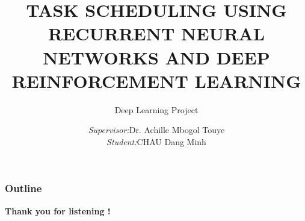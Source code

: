 \documentclass[xcolor=dvipsnames, aspectratio=169, 10pt]{beamer}
\title[]{TASK SCHEDULING USING RECURRENT NEURAL NETWORKS AND DEEP REINFORCEMENT LEARNING}
\subtitle{Deep Learning Project}
\author[Minh]{
		\begin{tabular}{lll}
			\textit{\small Supervisor:} & \small Dr. Achille Mbogol Touye \\
			\textit{\small Student:} & \small CHAU Dang Minh
            \vspace{.5cm}\\
		\end{tabular}
	}
\institute[Limoges]{
	{
		University of Limoges
	}
}
\begin{document}
\date{}
\begin{frame}
    \titlepage
\end{frame}

\begin{frame}
    \frametitle{Outline}
    \tableofcontents
\end{frame}




\begin{frame}{}
    \begin{center}
        \Huge\textbf{Thank you for listening !}
    \end{center}
\end{frame}
\end{document}

